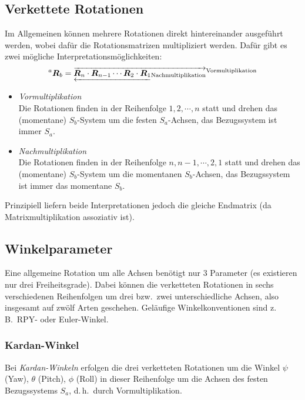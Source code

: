 \documentclass[a4paper, 11pt, accentcolor = tud3b]{tudreport}
\newcommand{\inreferenceto}[2]{\prescript{#1}{}{#2}}
\newcommand{\mat}[1]{\boldsymbol{#1}}
\renewcommand{\dh}{d.\,h.~}
\newcommand{\bzw}{bzw.~}
\newcommand{\zB}{z.\,B.~}
\begin{document}
			\subsection{Verkettete Rotationen}
				Im Allgemeinen können mehrere Rotationen direkt hintereinander ausgeführt werden, wobei dafür die Rotationsmatrizen multipliziert werden. Dafür gibt es zwei mögliche Interpretationsmöglichkeiten:
				\begin{equation*}
					\inreferenceto{a}{\mat{R}}_b = \overrightarrow{\underleftarrow{\mat{R}_n \cdot \mat{R}_{n - 1} \cdots \mat{R}_2 \cdot \mat{R}_1}_\text{Nachmultiplikation}}^\text{Vormultiplikation}
				\end{equation*}
				\begin{itemize}
					\item \emph{Vormultiplikation} \\ Die Rotationen finden in der Reihenfolge \( 1, 2, \cdots, n \) statt und drehen das (momentane) \(S_b\)-System um die festen \(S_a\)-Achsen, das Bezugssystem ist immer \(S_a\).
					\item \emph{Nachmultiplikation} \\ Die Rotationen finden in der Reihenfolge \( n, n - 1, \cdots, 2, 1 \) statt und drehen das (momentane) \(S_b\)-System um die momentanen \(S_b\)-Achsen, das Bezugssystem ist immer das momentane \(S_b\).
				\end{itemize}
				Prinzipiell liefern beide Interpretationen jedoch die gleiche Endmatrix (da Matrixmultiplikation assoziativ ist).

			\subsection{Winkelparameter}
				Eine allgemeine Rotation um alle Achsen benötigt nur \(3\) Parameter (es existieren nur drei Freiheitsgrade). Dabei können die verketteten Rotationen in sechs verschiedenen Reihenfolgen um drei \bzw zwei unterschiedliche Achsen, also insgesamt auf zwölf Arten geschehen. Geläufige Winkelkonventionen sind \zB RPY- oder Euler-Winkel.

				\subsubsection{Kardan-Winkel}
					Bei \emph{Kardan-Winkeln} erfolgen die drei verketteten Rotationen um die Winkel \(\psi\) (Yaw), \(\theta\) (Pitch), \(\phi\) (Roll) in dieser Reihenfolge um die Achsen des festen Bezugssystems \(S_a\), \dh durch Vormultiplikation.
				
\end{document}
